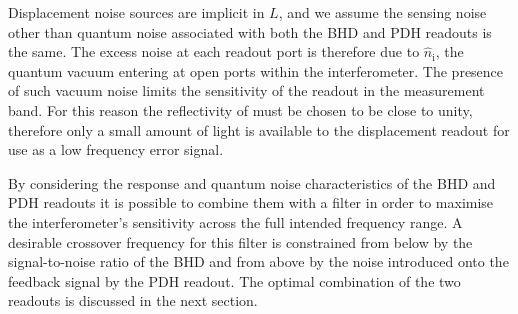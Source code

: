 Displacement noise sources are implicit in $L$, and we assume the sensing noise other than quantum noise associated with both the \gls{BHD} and \gls{PDH} readouts is the same. The excess noise at each readout port is therefore due to $\hat{n}_{\textrm{i}}$, the quantum vacuum entering at open ports within the interferometer. The presence of such vacuum noise limits the sensitivity of the readout in the measurement band. For this reason the reflectivity of \MNINE{} must be chosen to be close to unity, therefore only a small amount of light is available to the displacement readout for use as a low frequency error signal.

By considering the response and quantum noise characteristics of the \gls{BHD} and \gls{PDH} readouts it is possible to combine them with a filter in order to maximise the interferometer's sensitivity across the full intended frequency range. A desirable crossover frequency for this filter is constrained from below by the signal-to-noise ratio of the \gls{BHD} and from above by the noise introduced onto the feedback signal by the \gls{PDH} readout. The optimal combination of the two readouts is discussed in the next section.

